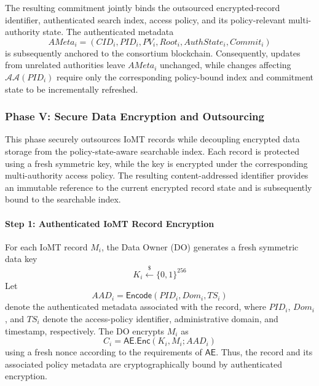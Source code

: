 \documentclass{ieeetj}
\theoremstyle{ieee-style}
\begin{document}
The resulting commitment jointly binds the outsourced encrypted-record
identifier, authenticated search index, access policy, and its
policy-relevant multi-authority state. The authenticated metadata
\begin{equation}
AMeta_i=
(CID_i,PID_i,PV_i,Root_i,AuthState_i,Commit_i)
\label{eq:authenticated-metadata}
\end{equation}
is subsequently anchored to the consortium blockchain. Consequently,
updates from unrelated authorities leave $AMeta_i$ unchanged, while
changes affecting $\mathcal{AA}(PID_i)$ require only the corresponding
policy-bound index and commitment state to be incrementally refreshed.


\subsubsection*{\textbf{Phase V: Secure Data Encryption and Outsourcing}}

This phase securely outsources IoMT records while decoupling encrypted
data storage from the policy-state-aware searchable index. Each record is
protected using a fresh symmetric key, while the key is encrypted under
the corresponding multi-authority access policy. The resulting
content-addressed identifier provides an immutable reference to the
current encrypted record state and is subsequently bound to the
searchable index.

\paragraph*{Step 1: Authenticated IoMT Record Encryption}

For each IoMT record $M_i$, the Data Owner (DO) generates a fresh
symmetric data key
\begin{equation}
K_i\overset{\$}{\leftarrow}\{0,1\}^{256}
\end{equation}
Let
\begin{equation}
AAD_i=
\mathsf{Encode}(PID_i,Dom_i,TS_i)
\end{equation}
denote the authenticated metadata associated with the record, where
$PID_i$, $Dom_i$, and $TS_i$ denote the access-policy identifier,
administrative domain, and timestamp, respectively. The DO encrypts
$M_i$ as
\begin{equation}
C_i=
\mathsf{AE.Enc}(K_i,M_i;AAD_i)
\label{eq:data-encryption}
\end{equation}
using a fresh nonce according to the requirements of $\mathsf{AE}$.
Thus, the record and its associated policy metadata are cryptographically
bound by authenticated encryption.
\end{document}
